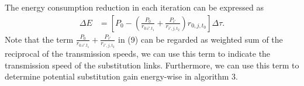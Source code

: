 \documentclass[conference]{IEEEtran}
\begin{document}
The energy consumption reduction in each iteration can be expressed as 
\begin{align}
      \Delta E & = \left[ {P_0}- \left( {\frac{{{P_0}}}{{{r_{0.i'.{t_1}}}}} + \frac{{{P_{i'}}}}{{{r_{i',j,{t_2}}}}}} \right){r_{0,j,{t_0}}} \right] \Delta \tau.
\end{align}
Note that the term $ {\frac{{{P_0}}}{{{r_{0.i'.{t_1}}}}} + \frac{{{P_{i'}}}}{{{r_{i',j,{t_2}}}}}} $ in (9) can be regarded as weighted sum of the reciprocal of the transmission speeds, we can use this term to indicate the transmission speed of the substitution links. Furthermore, we can use this term to determine potential substitution gain energy-wise in algorithm 3. %
\end{document}
